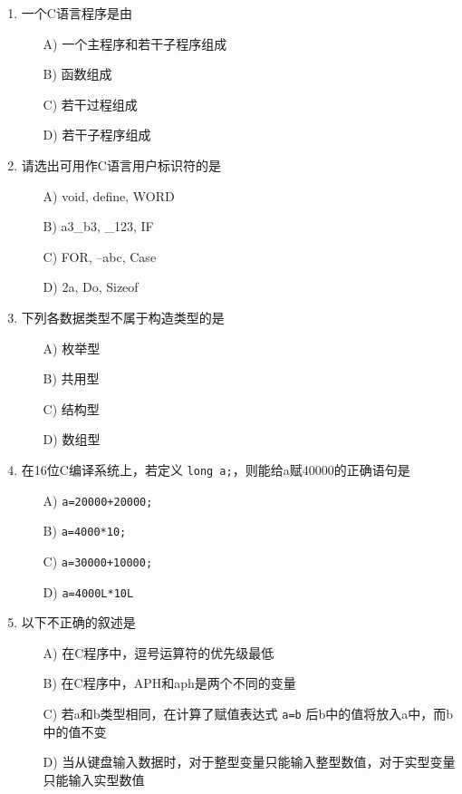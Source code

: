 \documentclass[a4paper,12pt]{article}
\begin{document}
\begin{enumerate}
	\item 一个C语言程序是由
	      \begin{enumerate}
		      \item[A)] 一个主程序和若干子程序组成
		      \item[B)] 函数组成
		      \item[C)] 若干过程组成
		      \item[D)] 若干子程序组成
	      \end{enumerate}
	      \vspace{0.3cm}

	\item 请选出可用作C语言用户标识符的是
	      \begin{enumerate}
		      \item[A)] void, define, WORD
		      \item[B)] a3\_b3, \_123, IF
		      \item[C)] FOR, --abc, Case
		      \item[D)] 2a, Do, Sizeof
	      \end{enumerate}
	      \vspace{0.3cm}

	\item 下列各数据类型不属于构造类型的是
	      \begin{enumerate}
		      \item[A)] 枚举型
		      \item[B)] 共用型
		      \item[C)] 结构型
		      \item[D)] 数组型
	      \end{enumerate}
	      \vspace{0.3cm}

	\item 在16位C编译系统上，若定义 \texttt{long a;}，则能给a赋40000的正确语句是
	      \begin{enumerate}
		      \item[A)] \texttt{a=20000+20000;}
		      \item[B)] \texttt{a=4000*10;}
		      \item[C)] \texttt{a=30000+10000;}
		      \item[D)] \texttt{a=4000L*10L}
	      \end{enumerate}
	      \vspace{0.3cm}

	\item 以下不正确的叙述是
	      \begin{enumerate}
		      \item[A)] 在C程序中，逗号运算符的优先级最低
		      \item[B)] 在C程序中，APH和aph是两个不同的变量
		      \item[C)] 若a和b类型相同，在计算了赋值表达式 \texttt{a=b} 后b中的值将放入a中，而b中的值不变
		      \item[D)] 当从键盘输入数据时，对于整型变量只能输入整型数值，对于实型变量只能输入实型数值
	      \end{enumerate}
	      \vspace{0.3cm}


\end{enumerate}
\end{document}
